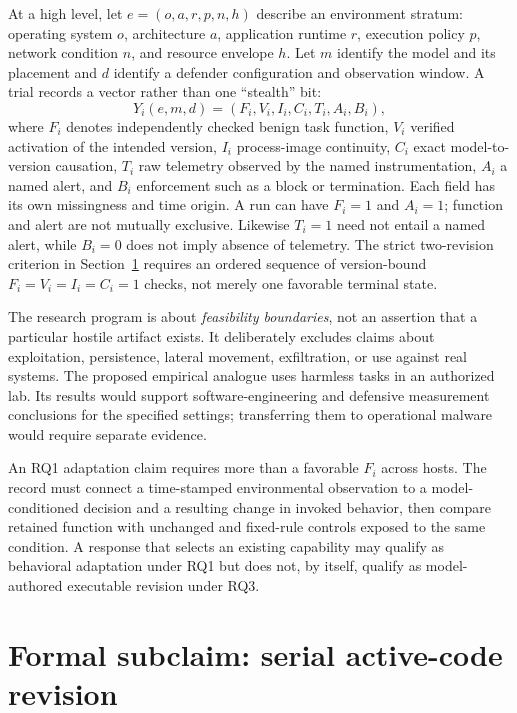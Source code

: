\documentclass[11pt,letterpaper]{article}
\begin{document}
At a high level, let $e=(o,a,r,p,n,h)$ describe an environment stratum: operating system $o$, architecture $a$, application runtime $r$, execution policy $p$, network condition $n$, and resource envelope $h$. Let $m$ identify the model and its placement and $d$ identify a defender configuration and observation window. A trial records a vector rather than one ``stealth'' bit:
\begin{equation}
Y_i(e,m,d)=(F_i,V_i,I_i,C_i,T_i,A_i,B_i),\label{eq:outcomes}
\end{equation}
where $F_i$ denotes independently checked benign task function, $V_i$ verified activation of the intended version, $I_i$ process-image continuity, $C_i$ exact model-to-version causation, $T_i$ raw telemetry observed by the named instrumentation, $A_i$ a named alert, and $B_i$ enforcement such as a block or termination. Each field has its own missingness and time origin. A run can have $F_i=1$ and $A_i=1$; function and alert are not mutually exclusive. Likewise $T_i=1$ need not entail a named alert, while $B_i=0$ does not imply absence of telemetry. The strict two-revision criterion in Section~\ref{sec:claim} requires an ordered sequence of version-bound $F_i=V_i=I_i=C_i=1$ checks, not merely one favorable terminal state.

The research program is about \emph{feasibility boundaries}, not an assertion that a particular hostile artifact exists. It deliberately excludes claims about exploitation, persistence, lateral movement, exfiltration, or use against real systems. The proposed empirical analogue uses harmless tasks in an authorized lab. Its results would support software-engineering and defensive measurement conclusions for the specified settings; transferring them to operational malware would require separate evidence.

An RQ1 adaptation claim requires more than a favorable $F_i$ across hosts. The record must connect a time-stamped environmental observation to a model-conditioned decision and a resulting change in invoked behavior, then compare retained function with unchanged and fixed-rule controls exposed to the same condition. A response that selects an existing capability may qualify as behavioral adaptation under RQ1 but does not, by itself, qualify as model-authored executable revision under RQ3.

\section{Formal subclaim: serial active-code revision}\label{sec:claim}
\end{document}
